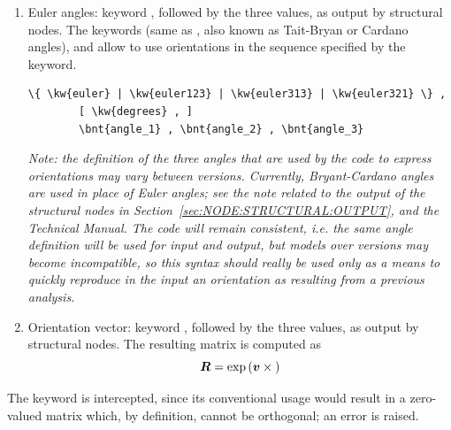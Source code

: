 \begin{enumerate}
\item Euler angles: keyword , followed by the three
values, as output by structural nodes.
The keywords  (same as , also known as Tait-Bryan or Cardano angles),  and 
allow to use orientations in the sequence specified by the keyword.
\begin{Verbatim}[commandchars=\\\{\}]
    \{ \kw{euler} | \kw{euler123} | \kw{euler313} | \kw{euler321} \} ,
        [ \kw{degrees} , ]
        \bnt{angle_1} , \bnt{angle_2} , \bnt{angle_3}
\end{Verbatim}

\emph{Note: the definition of the three angles that are used 
by the code to express orientations may vary between versions.
Currently, Bryant-Cardano angles are used in place of Euler
angles; see the note related to the output of the structural nodes
in Section~\ref{sec:NODE:STRUCTURAL:OUTPUT}, and the Technical Manual.
The code will remain consistent, i.e. the same angle
definition will be used for input and output, but models
over versions may become incompatible, so this syntax should 
really be used only as a means to quickly reproduce in the input
an orientation as resulting from a previous analysis.}

\item Orientation vector: keyword , followed by the three
values, as output by structural nodes.
The resulting matrix is computed as
\begin{equation}
	\boldsymbol{R} = \exp\left( \boldsymbol{v}\times{} \right)
\end{equation}
\end{enumerate}

The keyword  is intercepted, since its conventional usage
would result in a zero-valued matrix which, by definition, cannot be orthogonal;
an error is raised.

